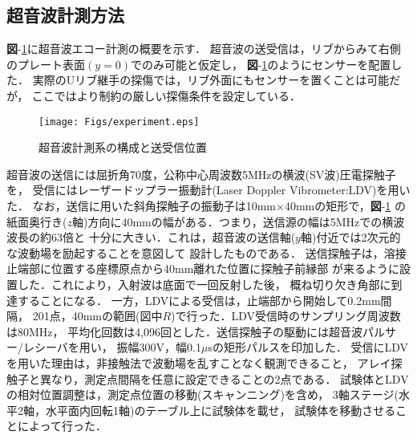 \subsection{超音波計測方法}
{\bf 図}-\ref{fig:experiment}に超音波エコー計測の概要を示す．
超音波の送受信は，リブからみて右側のプレート表面$(y=0)$でのみ可能と仮定し，
{\bf 図}-\ref{fig:experiment}のようにセンサーを配置した．
実際のUリブ継手の探傷では，リブ外面にもセンサーを置くことは可能だが，
ここではより制約の厳しい探傷条件を設定している．
\begin{figure}[thb]
\centering
	\texttt{[image: Figs/experiment.eps]}
	\caption{超音波計測系の構成と送受信位置}
	\label{fig:experiment}
\end{figure}
超音波の送信には屈折角70度，公称中心周波数5MHzの横波(SV波)圧電探触子を，
受信にはレーザードップラー振動計(Laser Doppler Vibrometer:LDV)を用いた．
%
なお，送信に用いた斜角探触子の振動子は10mm$\times$40mmの矩形で，{\bf 図}-\ref{fig:experiment}
の紙面奥行き($z$軸)方向に40mmの幅がある．つまり，送信源の幅は5MHzでの横波波長の約63倍と
十分に大きい．これは，超音波の送信軸($y$軸)付近では2次元的な波動場を励起することを意図して
設計したものである．
%
送信探触子は，溶接止端部に位置する座標原点から40mm離れた位置に探触子前縁部
が来るように設置した．これにより，入射波は底面で一回反射した後，
概ね切り欠き角部に到達することになる．
一方，LDVによる受信は，止端部から開始して0.2mm間隔，
201点，40mmの範囲(図中$R$)で行った．LDV受信時のサンプリング周波数は80MHz，
平均化回数は4,096回とした．送信探触子の駆動には超音波パルサー/レシーバを用い，
振幅300V，幅0.1$\mu$sの矩形パルスを印加した．
受信にLDVを用いた理由は，非接触法で波動場を乱すことなく観測できること，
アレイ探触子と異なり，測定点間隔を任意に設定できることの2点である．
試験体とLDVの相対位置調整は，測定点位置の移動(スキャンニング)を含め，
3軸ステージ(水平2軸，水平面内回転1軸)のテーブル上に試験体を載せ，
試験体を移動させることによって行った．
